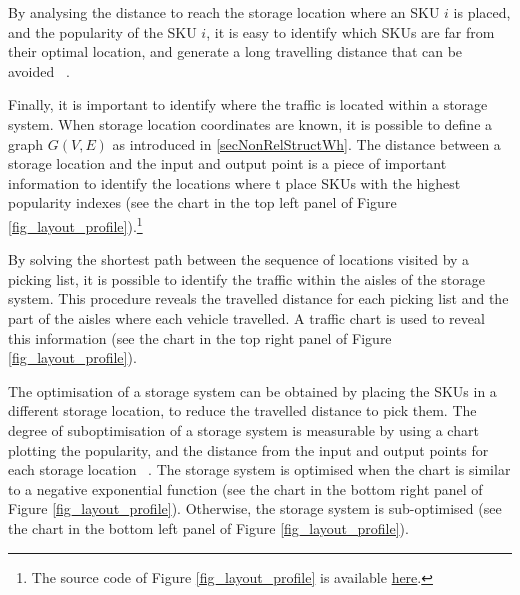 By analysing the distance to reach the storage location where an SKU $i$ is placed, and the popularity of the SKU $i$, it is easy to identify which SKUs are far from their optimal location, and generate a long travelling distance that can be avoided ~\cite{Manzini2018}.\par

Finally, it is important to identify where the traffic is located within a storage system.  When storage location coordinates are known, it is possible to define a graph $G(V,E)$ as introduced in \ref{secNonRelStructWh}. The distance between a storage location and the input and output point is a piece of important information to identify the locations where t place SKUs with the highest popularity indexes (see the chart in the top left panel of Figure \ref{fig_layout_profile}).\footnote{The source code of Figure \ref{fig_layout_profile} is available \href{https://github.com/aletuf93/logproj/blob/master/examples/WH_04\%20Warehouse\%20layout\%20assessment.ipynb}{here}.} \par

By solving the shortest path between the sequence of locations visited by a picking list, it is possible to identify the traffic within the aisles of the storage system. This procedure reveals the travelled distance for each picking list and the part of the aisles where each vehicle travelled. A traffic chart is used to reveal this information (see the chart in the top right panel of Figure \ref{fig_layout_profile}). \par

The optimisation of a storage system can be obtained by placing the SKUs in a different storage location, to reduce the travelled distance to pick them. The degree of suboptimisation of a storage system is measurable by using a chart plotting the popularity, and the distance from the input and output points for each storage location ~\cite{Manzini2018}. The storage system is optimised when the chart is similar to a negative exponential function (see the chart in the bottom right panel of Figure \ref{fig_layout_profile}). Otherwise, the storage system is sub-optimised (see the chart in the bottom left panel of Figure \ref{fig_layout_profile}). \par

